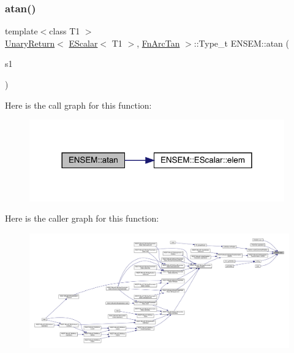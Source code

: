 \subsubsection{\texorpdfstring{atan()}{atan()}}
{\footnotesize\ttfamily template$<$class T1 $>$ \\
\mbox{\hyperlink{structENSEM_1_1UnaryReturn}{Unary\+Return}}$<$ \mbox{\hyperlink{classENSEM_1_1EScalar}{E\+Scalar}}$<$ T1 $>$, \mbox{\hyperlink{structENSEM_1_1FnArcTan}{Fn\+Arc\+Tan}} $>$\+::Type\+\_\+t E\+N\+S\+E\+M\+::atan (\begin{DoxyParamCaption}\item[{const \mbox{\hyperlink{classENSEM_1_1EScalar}{E\+Scalar}}$<$ T1 $>$ \&}]{s1 }\end{DoxyParamCaption})\hspace{0.3cm}{\ttfamily [inline]}}

Here is the call graph for this function\+:\nopagebreak
\begin{figure}[H]
\begin{center}
\leavevmode
\includegraphics[width=312pt]{d4/dca/group__escalar_ga3169598490417ab5713660967ec6b658_cgraph}
\end{center}
\end{figure}
Here is the caller graph for this function\+:
\nopagebreak
\begin{figure}[H]
\begin{center}
\leavevmode
\includegraphics[width=350pt]{d4/dca/group__escalar_ga3169598490417ab5713660967ec6b658_icgraph}
\end{center}
\end{figure}
\mbox{\label{group__escalar_ga9a9d48948d119981259ad0ebcb0acfea}} 
